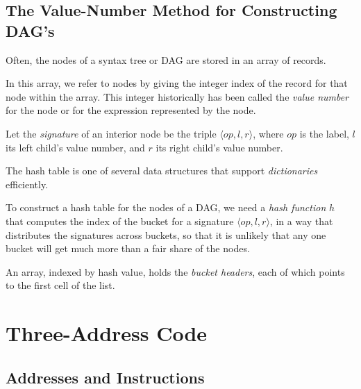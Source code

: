 \documentclass[12pt,a4paper,twoside,openany]{book}
\begin{document}
\subsection{The Value-Number Method for Constructing DAG's}

Often, the nodes of a syntax tree or DAG are stored in an array of records.

In this array, we refer to nodes by giving the integer index of the record for that node within the array. This integer historically has been called the \textit{value number} for the node or for the expression represented by the node.

Let the \textit{signature} of an interior node be the triple $\langle op,l,r\rangle$, where $op$ is the label, $l$ its left child's value number, and $r$ its right child's value number.

The hash table is one of several data structures that support \textit{dictionaries} efficiently.

To construct a hash table for the nodes of a DAG, we need a \textit{hash function} $h$ that computes the index of the bucket for a signature $\langle op,l,r\rangle$, in a way that distributes the signatures across buckets, so that it is unlikely that any one bucket will get much more than a fair share of the nodes.

An array, indexed by hash value, holds the \textit{bucket headers}, each of which points to the first cell of the list.

\section{Three-Address Code}
\subsection{Addresses and Instructions}
\end{document}

